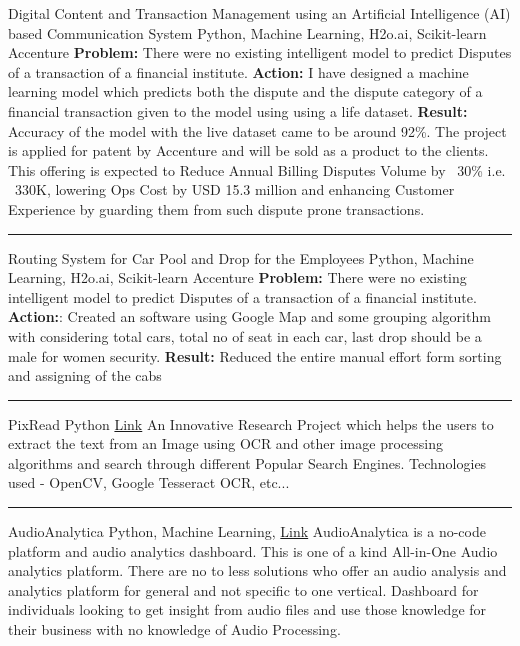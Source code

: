 \begin{cventries}
	\cventry
	{}
	{Digital Content and Transaction Management using an Artificial Intelligence (AI) based Communication System}
	{Python, Machine Learning, H2o.ai, Scikit-learn}
	{Accenture}
	{\textbf{Problem:} There were no existing intelligent model to predict Disputes of a transaction of a financial institute.\newline
		\textbf{Action:} I have designed a machine learning model which predicts both the dispute and the dispute category of a financial transaction given to the model using using a life dataset.\newline
		\textbf{Result:} Accuracy of the model with the live dataset came to be around 92\%. The project is applied for patent by Accenture and will be sold as a product to the clients. This offering is expected to Reduce Annual Billing Disputes Volume by ~30\% i.e. ~330K, lowering Ops Cost by USD 15.3 million and enhancing Customer Experience by guarding them from such dispute prone transactions.
	}

	\begin{center}
		\rule{30mm}{.1mm}
	\end{center}

	\cventry
	{}
	{Routing System for Car Pool and Drop for the Employees}
	{Python, Machine Learning, H2o.ai, Scikit-learn}
	{Accenture}
	{\textbf{Problem:} There were no existing intelligent model to predict Disputes of a transaction of a financial institute.\newline
		\textbf{Action:}: Created an software using Google Map and some grouping algorithm with considering total cars, total no of seat in each car, last drop should be a male for women security.\newline
		\textbf{Result:} Reduced the entire manual effort form sorting and assigning of the cabs
	}

	\begin{center}
		\rule{30mm}{.1mm}
	\end{center}

	\cventry
	{}
	{PixRead}
	{Python}
	{\href{https://github.com/rehanguha/pixread}{\faLink Link}}
	{An Innovative Research Project which helps the users to extract the text from an Image using OCR and other image processing algorithms and search through different Popular Search Engines. Technologies used - OpenCV, Google Tesseract OCR, etc...}

	\begin{center}
		\rule{30mm}{.1mm}
	\end{center}

	\cventry
	{}
	{AudioAnalytica}
	{Python, Machine Learning, }
	{\href{https://github.com/rehanguha/AudioAnalytica}{\faLink Link}}
	{AudioAnalytica is a no-code platform and audio analytics dashboard.
	This is one of a kind All-in-One Audio analytics platform.
	There are no to less solutions who offer an audio analysis and analytics platform for general and not specific to one vertical.
	Dashboard for individuals looking to get insight from audio files and use those knowledge for their business with no knowledge of Audio Processing.
	}

	\vspace{5mm}
\end{cventries}